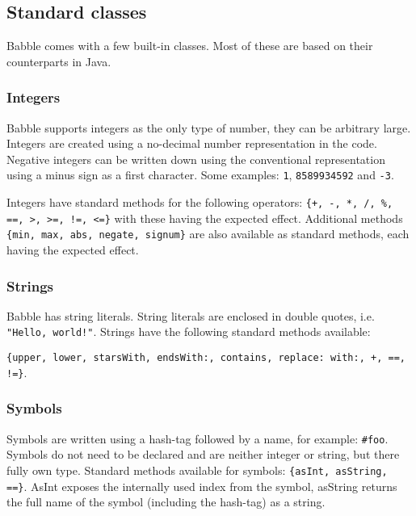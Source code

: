 \documentclass[a4paper]{article}
\begin{document}
\subsection{Standard classes}

Babble comes with a few built-in classes. Most of these are based on their counterparts in Java.



\subsubsection{Integers}

Babble supports integers as the only type of number, they can be arbitrary large. Integers are created using a no-decimal number representation in the code. Negative integers can be written down using the conventional representation using a minus sign as a first character. Some examples:
\verb|1|, \verb|8589934592| and \verb|-3|.

Integers have standard methods for the following operators: \verb|{+, -, *, /, %, ==, >, >=, !=, <=}| with these having the expected effect. Additional methods \verb|{min, max, abs, negate, signum}| are also available as standard methods, each having the expected effect.

\subsubsection{Strings}

Babble has string literals. String literals are enclosed in double quotes, i.e. \verb|"Hello, world!"|. Strings have the following standard methods available:

\verb|{upper, lower, starsWith, endsWith:, contains, replace: with:, +, ==, !=}|.

\subsubsection{Symbols}

Symbols are written using a hash-tag followed by a name, for example: \verb|#foo|. Symbols do not need to be declared and are neither integer or string, but there fully own type. Standard methods available for symbols:
\verb|{asInt, asString, ==}|. AsInt exposes the internally used index from the symbol, asString returns the full name of the symbol (including the hash-tag) as a string.
\end{document}
